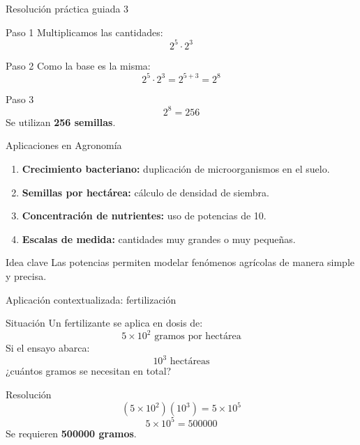 \documentclass[aspectratio=169,10pt,handout]{beamer}
\newcommand{\destacar}[1]{\textcolor{USTBlueDark}{\textbf{#1}}}
\newcommand{\pp}{\pause}
\newenvironment{ideaBox}
{\begin{exampleblock}{Idea clave}}
	{\end{exampleblock}}
\begin{document}
	\begin{frame}{Resolución práctica guiada 3}
		\begin{exampleblock}{Paso 1}
			Multiplicamos las cantidades:
			\[
			2^5\cdot2^3
			\]
		\end{exampleblock}
		
		\pp
		
		\begin{exampleblock}{Paso 2}
			Como la base es la misma:
			\[
			2^5\cdot2^3=2^{5+3}=2^8
			\]
		\end{exampleblock}
		
		\pp
		
		\begin{exampleblock}{Paso 3}
			\[
			2^8=256
			\]
			Se utilizan \textbf{256 semillas}.
		\end{exampleblock}
	\end{frame}
	
	\begin{frame}{Aplicaciones en Agronomía}
		\begin{enumerate}
			\item \destacar{Crecimiento bacteriano:} duplicación de microorganismos en el suelo.
			\item \destacar{Semillas por hectárea:} cálculo de densidad de siembra.
			\item \destacar{Concentración de nutrientes:} uso de potencias de 10.
			\item \destacar{Escalas de medida:} cantidades muy grandes o muy pequeñas.
		\end{enumerate}
		
		\pp
		
		\begin{ideaBox}
			Las potencias permiten modelar fenómenos agrícolas de manera simple y precisa.
		\end{ideaBox}
	\end{frame}
	
	\begin{frame}{Aplicación contextualizada: fertilización}
		\begin{block}{Situación}
			Un fertilizante se aplica en dosis de:
			\[
			5\times10^2 \text{ gramos por hectárea}
			\]
			Si el ensayo abarca:
			\[
			10^3 \text{ hectáreas}
			\]
			¿cuántos gramos se necesitan en total?
		\end{block}
		
		\pp
		
		\begin{exampleblock}{Resolución}
			\[
			(5\times10^2)(10^3)=5\times10^5
			\]
			\[
			5\times10^5=500000
			\]
			Se requieren \textbf{500000 gramos}.
		\end{exampleblock}
	\end{frame}
	
\end{document}
